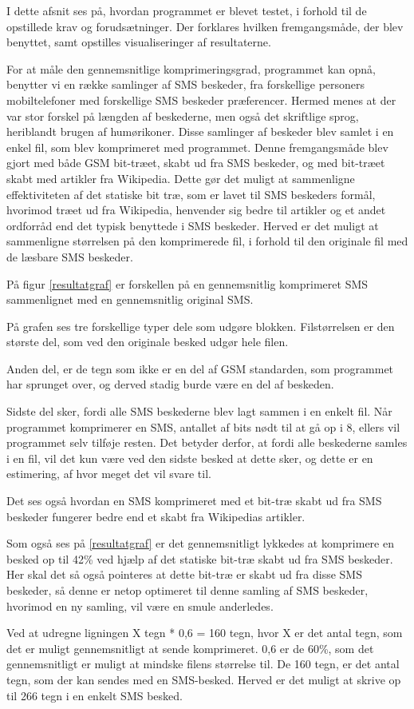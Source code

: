 I dette afsnit ses på, hvordan programmet er blevet testet, i forhold til de opstillede krav og 
forudsætninger. Der forklares hvilken fremgangsmåde, der blev benyttet, samt opstilles visualiseringer af 
resultaterne.

For at måle den gennemsnitlige komprimeringsgrad, programmet kan opnå, benytter vi en række samlinger 
af SMS beskeder, fra forskellige personers mobiltelefoner med forskellige SMS beskeder præferencer. Hermed menes at der 
var stor forskel på længden af beskederne, men også det skriftlige sprog, heriblandt brugen af 
humørikoner.
Disse samlinger af beskeder blev samlet i en enkel fil, som blev komprimeret med programmet.
Denne fremgangsmåde blev gjort med både GSM bit-træet, skabt ud fra SMS beskeder, og med bit-træet skabt med 
artikler fra Wikipedia. Dette gør det muligt at sammenligne effektiviteten af det statiske bit træ, som 
er lavet til SMS beskeders formål, hvorimod træet ud fra Wikipedia, henvender sig bedre til artikler og et 
andet ordforråd end det typisk benyttede i SMS beskeder.
Herved er det muligt at sammenligne størrelsen på den komprimerede fil, i forhold til den originale fil 
med de læsbare SMS beskeder.

På figur \ref{resultatgraf} er forskellen på en gennemsnitlig komprimeret SMS sammenlignet med en 
gennemsnitlig original SMS.

På grafen ses tre forskellige typer dele som udgøre blokken. Filstørrelsen er den største del, som ved den 
originale besked udgør hele filen.

Anden del, er de tegn som ikke er en del af GSM standarden, som programmet har sprunget over, og derved 
stadig burde være en del af beskeden.

Sidste del sker, fordi alle SMS beskederne blev lagt sammen i en enkelt fil. Når programmet komprimerer en SMS, 
antallet af bits nødt til at gå op i 8, ellers vil programmet selv tilføje resten. Det betyder derfor, at 
fordi alle beskederne samles i en fil, vil det kun være ved den sidste besked at dette sker, og dette er 
en estimering, af hvor meget det vil svare til.

Det ses også hvordan en SMS komprimeret med et bit-træ skabt ud fra SMS beskeder fungerer bedre end et skabt 
fra Wikipedias artikler.



Som også ses på \ref{resultatgraf} er det gennemsnitligt lykkedes at komprimere en besked op til 42\% ved 
hjælp af det statiske bit-træ skabt ud fra SMS beskeder.
Her skal det så også pointeres at dette bit-træ er skabt ud fra disse SMS beskeder, så denne er netop optimeret 
til denne samling af SMS beskeder, hvorimod en ny samling, vil være en smule anderledes.

Ved at udregne ligningen X tegn * 0,6 = 160 tegn, hvor X er det antal tegn, som det er muligt 
gennemsnitligt at sende komprimeret. 0,6 er de 60\%, som det gennemsnitligt er muligt at mindske filens 
størrelse til. De 160 tegn, er det antal tegn, som der kan sendes med en SMS-besked.
Herved er det muligt at skrive op til 266 tegn i en enkelt SMS besked.
